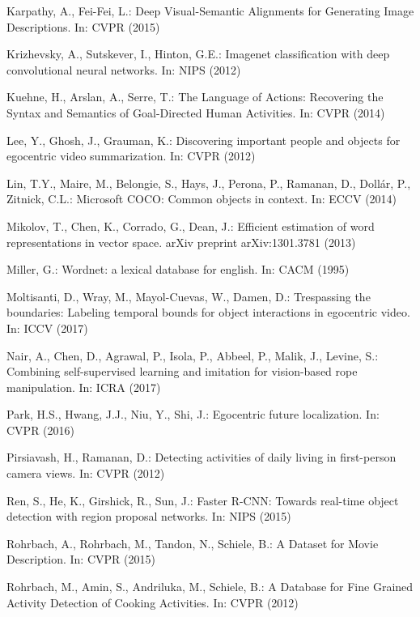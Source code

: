 \documentclass[runningheads]{llncs}
\begin{document}
\begin{thebibliography}{10}
Karpathy, A., Fei-Fei, L.: {Deep Visual-Semantic Alignments for Generating
  Image Descriptions}. In: CVPR (2015)

Krizhevsky, A., Sutskever, I., Hinton, G.E.: {Imagenet classification with deep
  convolutional neural networks}. In: NIPS (2012)

Kuehne, H., Arslan, A., Serre, T.: {The Language of Actions: Recovering the
  Syntax and Semantics of Goal-Directed Human Activities}. In: CVPR (2014)

Lee, Y., Ghosh, J., Grauman, K.: Discovering important people and objects for
  egocentric video summarization. In: CVPR (2012)

Lin, T.Y., Maire, M., Belongie, S., Hays, J., Perona, P., Ramanan, D.,
  Doll{\'a}r, P., Zitnick, C.L.: Microsoft {COCO}: Common objects in context.
  In: ECCV (2014)

Mikolov, T., Chen, K., Corrado, G., Dean, J.: Efficient estimation of word
  representations in vector space. arXiv preprint arXiv:1301.3781  (2013)

Miller, G.: Wordnet: a lexical database for english. In: CACM (1995)

Moltisanti, D., Wray, M., Mayol-Cuevas, W., Damen, D.: Trespassing the
  boundaries: Labeling temporal bounds for object interactions in egocentric
  video. In: ICCV (2017)

Nair, A., Chen, D., Agrawal, P., Isola, P., Abbeel, P., Malik, J., Levine, S.:
  Combining self-supervised learning and imitation for vision-based rope
  manipulation. In: ICRA (2017)

Park, H.S., Hwang, J.J., Niu, Y., Shi, J.: Egocentric future localization. In:
  CVPR (2016)

Pirsiavash, H., Ramanan, D.: Detecting activities of daily living in
  first-person camera views. In: CVPR (2012)

Ren, S., He, K., Girshick, R., Sun, J.: Faster {R-CNN}: Towards real-time
  object detection with region proposal networks. In: NIPS (2015)

Rohrbach, A., Rohrbach, M., Tandon, N., Schiele, B.: {A Dataset for Movie
  Description}. In: CVPR (2015)

Rohrbach, M., Amin, S., Andriluka, M., Schiele, B.: {A Database for Fine
  Grained Activity Detection of Cooking Activities}. In: CVPR (2012)


\end{thebibliography}
\end{document}
